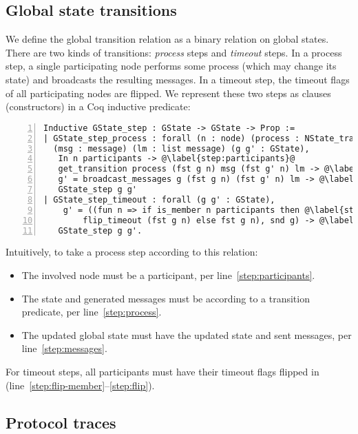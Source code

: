 \documentclass{easychair}
\begin{document}
\subsection{Global state transitions}
We define the global transition relation as a binary relation on global states. There are two kinds of transitions: \emph{process} steps and \emph{timeout} steps. In a process step, a single participating node performs some process (which may change its state) and broadcasts the resulting messages. In a timeout step, the timeout flags of all participating nodes are flipped. We represent these two steps as clauses (constructors) in a Coq inductive predicate:
\begin{lstlisting}[language=Coq,numbers=left,numberstyle=\footnotesize,escapechar=@]
Inductive GState_step : GState -> GState -> Prop :=
| GState_step_process : forall (n : node) (process : NState_transition_type)
  (msg : message) (lm : list message) (g g' : GState),
   In n participants -> @\label{step:participants}@
   get_transition process (fst g n) msg (fst g' n) lm -> @\label{step:process}@
   g' = broadcast_messages g (fst g n) (fst g' n) lm -> @\label{step:messages}@
   GState_step g g'
| GState_step_timeout : forall (g g' : GState),
    g' = ((fun n => if is_member n participants then @\label{step:flip-member}@
        flip_timeout (fst g n) else fst g n), snd g) -> @\label{step:flip}@
   GState_step g g'.
\end{lstlisting}
Intuitively, to take a process step according to this relation:
\begin{itemize}[leftmargin=*]
\setlength\itemsep{-0.4em}
\item The involved node must be a participant, per line~\ref{step:participants}.
\item The state and generated messages must be according to a transition predicate, per line~\ref{step:process}.
\item The updated global state  must have the updated state and sent messages, per line~\ref{step:messages}.
\end{itemize}
For timeout steps, all participants must have their timeout flags flipped in  (line~\ref{step:flip-member}--\ref{step:flip}).

\subsection{Protocol traces}
\end{document}
